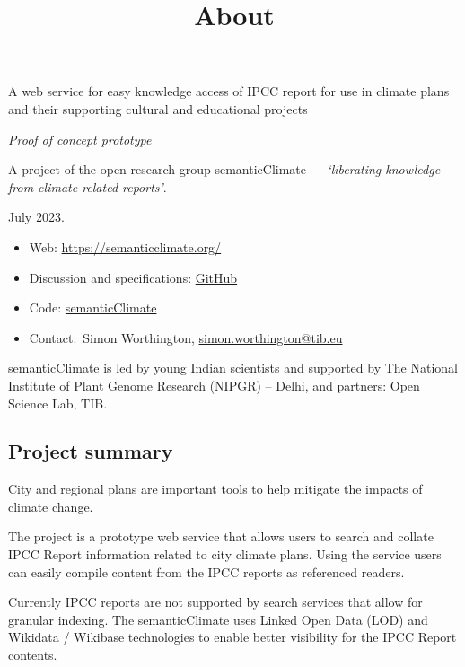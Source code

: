 \documentclass{article}
\begin{document}
\title{About}

\maketitle


A web service for easy knowledge access of IPCC report for use in climate plans and their supporting cultural and educational projects


\emph{Proof of concept prototype}


A project of the open research group semanticClimate — \emph{‘liberating knowledge from climate-related reports’}.


July 2023. 

\begin{itemize}
\item Web: \href{https://semanticclimate.org/}{https://semanticclimate.org/} 


\item Discussion and specifications: \href{https://github.com/petermr/semanticClimate/discussions/32}{GitHub} 


\item Code: \href{https://github.com/petermr/semanticClimate}{semanticClimate} 


\item Contact: Simon Worthington, \href{mailto:simon.worthington@tib.eu}{simon.worthington@tib.eu} 


\end{itemize}

semanticClimate is led by young Indian scientists and supported by The National Institute of Plant Genome Research (NIPGR) – Delhi, and partners: Open Science Lab, TIB.


\subsection{Project summary}\label{H2966887}



City and regional plans are important tools to help mitigate the impacts of climate change. 


The project is a prototype web service that allows users to search and collate IPCC Report information related to city climate plans. Using the service users can easily compile content from the IPCC reports as referenced readers.


Currently IPCC reports are not supported by search services that allow for granular indexing. The semanticClimate uses Linked Open Data (LOD) and Wikidata / Wikibase technologies to enable better visibility for the IPCC Report contents.
\end{document}
